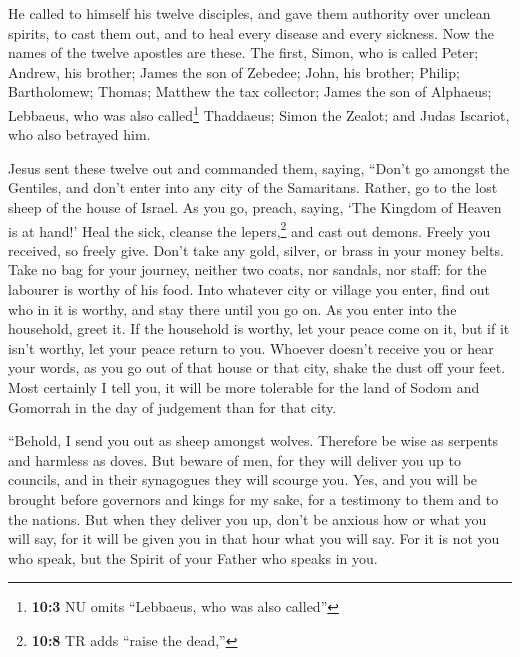  He called to himself his twelve disciples, and gave them
authority over unclean spirits, to cast them out, and to heal every
disease and every sickness.  Now the names of the twelve
apostles are these. The first, Simon, who is called Peter; Andrew, his
brother; James the son of Zebedee; John, his brother; 
Philip; Bartholomew; Thomas; Matthew the tax collector; James the son of
Alphaeus; Lebbaeus, who was also called\footnote{\textbf{10:3} NU omits
  ``Lebbaeus, who was also called''} Thaddaeus;  Simon the
Zealot; and Judas Iscariot, who also betrayed him.

 Jesus sent these twelve out and commanded them, saying,
``Don't go amongst the Gentiles, and don't enter into any city of the
Samaritans.  Rather, go to the lost sheep of the house of
Israel.  As you go, preach, saying, `The Kingdom of Heaven
is at hand!'  Heal the sick, cleanse the
lepers,\footnote{\textbf{10:8} TR adds ``raise the dead,''} and cast out
demons. Freely you received, so freely give.  Don't take
any gold, silver, or brass in your money belts.  Take no
bag for your journey, neither two coats, nor sandals, nor staff: for the
labourer is worthy of his food.  Into whatever city or
village you enter, find out who in it is worthy, and stay there until
you go on.  As you enter into the household, greet it.
 If the household is worthy, let your peace come on it,
but if it isn't worthy, let your peace return to you. 
Whoever doesn't receive you or hear your words, as you go out of that
house or that city, shake the dust off your feet.  Most
certainly I tell you, it will be more tolerable for the land of Sodom
and Gomorrah in the day of judgement than for that city.

 ``Behold, I send you out as sheep amongst wolves.
Therefore be wise as serpents and harmless as doves.  But
beware of men, for they will deliver you up to councils, and in their
synagogues they will scourge you.  Yes, and you will be
brought before governors and kings for my sake, for a testimony to them
and to the nations.  But when they deliver you up, don't
be anxious how or what you will say, for it will be given you in that
hour what you will say.  For it is not you who speak, but
the Spirit of your Father who speaks in you.

